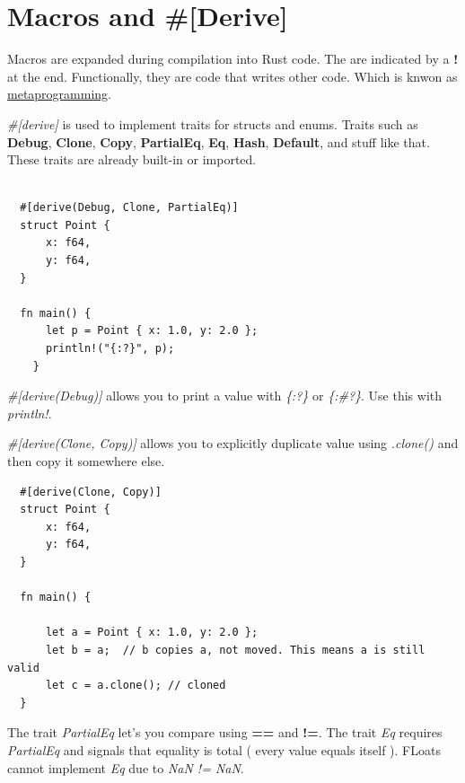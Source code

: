 \documentclass[11pt]{article}
\begin{document}
\section{Macros and \#[Derive]}
\label{sec:org98ce3ac}

Macros are expanded during compilation into Rust code. The are indicated by a \textbf{!} at the end.
Functionally, they are code that writes other code. Which is knwon as \uline{metaprogramming}.

\emph{\#[derive]} is used to implement traits for structs and enums. Traits such as \textbf{Debug}, \textbf{Clone}, \textbf{Copy}, \textbf{PartialEq}, \textbf{Eq}, \textbf{Hash}, \textbf{Default}, and stuff like that.
These traits are already built-in or imported.

\begin{verbatim}

  #[derive(Debug, Clone, PartialEq)]
  struct Point {
      x: f64,
      y: f64,
  }

  fn main() {
      let p = Point { x: 1.0, y: 2.0 };
      println!("{:?}", p);
    }

\end{verbatim}

\emph{\#[derive(Debug)]} allows you to print a value with \emph{\{:?\}} or \emph{\{:\#?\}}. Use this with \emph{println!}.

\emph{\#[derive(Clone, Copy)]} allows you to explicitly duplicate value using \emph{.clone()} and then copy it somewhere else.

\begin{verbatim}
  #[derive(Clone, Copy)]
  struct Point {
      x: f64,
      y: f64,
  }

  fn main() {

      let a = Point { x: 1.0, y: 2.0 };
      let b = a;  // b copies a, not moved. This means a is still valid
      let c = a.clone(); // cloned
  }

\end{verbatim}

The trait \emph{PartialEq} let's you compare using \textbf{==} and \textbf{!=}.
The trait \emph{Eq} requires \emph{PartialEq} and signals that equality is total ( every value equals itself ).
FLoats cannot implement \emph{Eq} due to \emph{NaN != NaN}.
\end{document}
